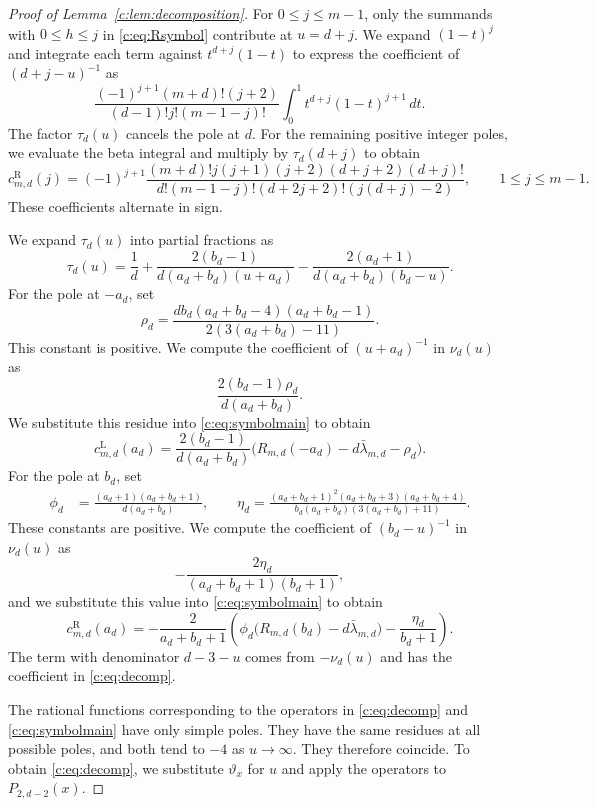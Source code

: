 \documentclass[11pt]{article}
\numberwithin{equation}{section}
\theoremstyle{remark}\newtheorem{remark}[theorem]{Remark}
\newcommand{\varthetax}{\vartheta_x}
\begin{document}
\begin{proof}[Proof of Lemma~\ref{c:lem:decomposition}]
For $0\le j\le m-1$, only the summands with $0\le h\le j$ in
\eqref{c:eq:Rsymbol} contribute at $u=d+j$.
We expand $(1-t)^j$ and integrate each term against $t^{d+j}(1-t)$
to express the coefficient of $(d+j-u)^{-1}$ as
\[
 \frac{(-1)^{j+1}(m+d)!(j+2)}{(d-1)!j!(m-1-j)!}
 \int_0^1t^{d+j}(1-t)^{j+1}\,dt.
\]
The factor $\tau_d(u)$ cancels the pole at $d$. For the remaining
positive integer poles, we evaluate the beta integral and multiply
by $\tau_d(d+j)$ to obtain
\begin{equation}\label{c:eq:rightinteger}
 c_{m,d}^{\mathrm R}(j)=(-1)^{j+1}
 \frac{(m+d)!j(j+1)(j+2)(d+j+2)(d+j)!}
 {d!(m-1-j)!(d+2j+2)!(j(d+j)-2)},
 \qquad 1\le j\le m-1.
\end{equation}
These coefficients alternate in sign.

We expand $\tau_d(u)$ into partial fractions as
\[
 \tau_d(u)=\frac1d+\frac{2(b_d-1)}{d(a_d+b_d)(u+a_d)}
 -\frac{2(a_d+1)}{d(a_d+b_d)(b_d-u)}.
\]
For the pole at $-a_d$, set
\[
 \rho_d=\frac{db_d(a_d+b_d-4)(a_d+b_d-1)}
 {2(3(a_d+b_d)-11)}.
\]
This constant is positive.
We compute the coefficient of $(u+a_d)^{-1}$ in $\nu_d(u)$ as
\[
 \frac{2(b_d-1)\rho_d}{d(a_d+b_d)}.
\]
We substitute this residue into \eqref{c:eq:symbolmain} to obtain
\begin{equation}\label{c:eq:leftstar}
 c_{m,d}^{\mathrm L}(a_d)=\frac{2(b_d-1)}{d(a_d+b_d)}
 \bigl(R_{m,d}(-a_d)-d\bar\lambda_{m,d}-\rho_d\bigr).
\end{equation}
For the pole at $b_d$, set
\[
 \begin{aligned}
 \phi_d&=\frac{(a_d+1)(a_d+b_d+1)}{d(a_d+b_d)},\qquad
 \eta_d=\frac{(a_d+b_d+1)^2(a_d+b_d+3)(a_d+b_d+4)}
 {b_d(a_d+b_d)(3(a_d+b_d)+11)}.
 \end{aligned}
\]
These constants are positive.
We compute the coefficient of $(b_d-u)^{-1}$ in $\nu_d(u)$ as
\[
 -\frac{2\eta_d}{(a_d+b_d+1)(b_d+1)},
\]
and we substitute this value into \eqref{c:eq:symbolmain} to obtain
\begin{equation}\label{c:eq:rightstar}
 c_{m,d}^{\mathrm R}(a_d)=-\frac{2}{a_d+b_d+1}
 \left(\phi_d\bigl(R_{m,d}(b_d)-d\bar\lambda_{m,d}\bigr)
 -\frac{\eta_d}{b_d+1}\right).
\end{equation}
The term with denominator $d-3-u$ comes from $-\nu_d(u)$ and has the
coefficient in \eqref{c:eq:decomp}.

The rational functions corresponding to the operators in
\eqref{c:eq:decomp} and \eqref{c:eq:symbolmain} have only simple poles.
They have the same residues at all possible poles, and both tend to
$-4$ as $u\to\infty$.
They therefore coincide. To obtain \eqref{c:eq:decomp}, we substitute
$\varthetax$ for $u$ and apply the operators to $P_{2,d-2}(x)$.
\end{proof}
\end{document}
